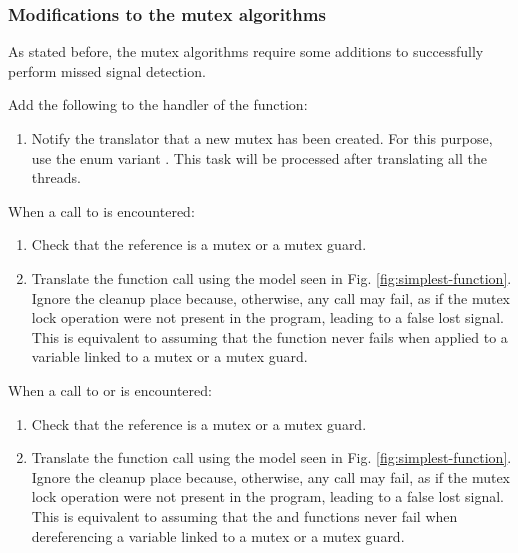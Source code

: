 \subsubsection{Modifications to the mutex algorithms}

As stated before, the mutex algorithms require some additions to successfully
perform missed signal detection.

Add the following to the handler of the  function:

\begin{enumerate}
      \item Notify the translator that a new mutex has been created.
            For this purpose, use the enum variant .
            This task will be processed after translating all the threads.
\end{enumerate}

When a call to  is encountered:

\begin{enumerate}
      \item Check that the  reference is a mutex or a mutex guard.
      \item Translate the function call using the model seen in Fig. \ref{fig:simplest-function}.
            Ignore the cleanup place because, otherwise, any call may fail,
            as if the mutex lock operation
            were not present in the program, leading to a false lost signal.
            This is equivalent to assuming that the  function never fails
            when applied to a variable linked to a mutex or a mutex guard.
\end{enumerate}

When a call to 
or  is encountered:

\begin{enumerate}
      \item Check that the  reference is a mutex or a mutex guard.
      \item Translate the function call using the model seen in Fig. \ref{fig:simplest-function}.
            Ignore the cleanup place because, otherwise, any call may fail,
            as if the mutex lock operation
            were not present in the program, leading to a false lost signal.
            This is equivalent to assuming that the 
            and  functions never fail
            when dereferencing a variable linked to a mutex or a mutex guard.
\end{enumerate}

